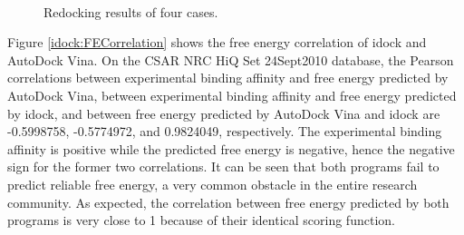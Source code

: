 \begin{figure}
\centering
{}
\\
\caption{Redocking results of four cases.}
\label{idock:Redocking}
\end{figure}

Figure \ref{idock:FECorrelation} shows the free energy correlation of idock and AutoDock Vina. On the CSAR NRC HiQ Set 24Sept2010 database, the Pearson correlations between experimental binding affinity and free energy predicted by AutoDock Vina, between experimental binding affinity and free energy predicted by idock, and between free energy predicted by AutoDock Vina and idock are -0.5998758, -0.5774972, and 0.9824049, respectively. The experimental binding affinity is positive while the predicted free energy is negative, hence the negative sign for the former two correlations. It can be seen that both programs fail to predict reliable free energy, a very common obstacle in the entire research community. As expected, the correlation between free energy predicted by both programs is very close to 1 because of their identical scoring function.

